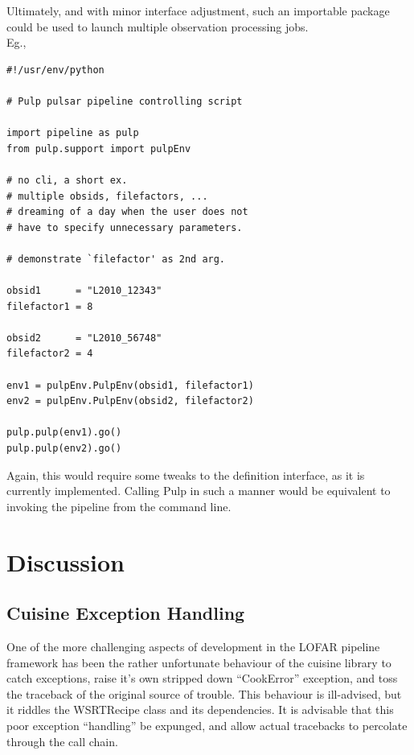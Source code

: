 \documentclass[a4paper,10pt,bibtotoc]{scrartcl}
\begin{document}
Ultimately, and with minor interface adjustment, such an importable package could be used to launch multiple observation processing jobs. \\
 Eg.,
\begin{verbatim}
#!/usr/env/python

# Pulp pulsar pipeline controlling script

import pipeline as pulp
from pulp.support import pulpEnv

# no cli, a short ex. 
# multiple obsids, filefactors, ... 
# dreaming of a day when the user does not
# have to specify unnecessary parameters.

# demonstrate `filefactor' as 2nd arg.

obsid1      = "L2010_12343"
filefactor1 = 8

obsid2      = "L2010_56748"
filefactor2 = 4

env1 = pulpEnv.PulpEnv(obsid1, filefactor1)
env2 = pulpEnv.PulpEnv(obsid2, filefactor2)

pulp.pulp(env1).go()
pulp.pulp(env2).go()
\end{verbatim}
Again, this would require some tweaks to the definition interface, as
it is currently implemented. Calling Pulp in such a manner would be
equivalent to invoking the pipeline from the command line.


\section{Discussion}
\label{sec:discussion}
\subsection{Cuisine Exception Handling}
One of the more challenging aspects of development in the LOFAR
pipeline framework has been the rather unfortunate behaviour of the
cuisine library to catch exceptions, raise it's own stripped down
``CookError'' exception, and toss the traceback of the original source
of trouble.  This behaviour is ill-advised, but it riddles the
WSRTRecipe class and its dependencies.  It is advisable that this poor
exception ``handling'' be expunged, and allow actual tracebacks to
percolate through the call chain.
\end{document}
